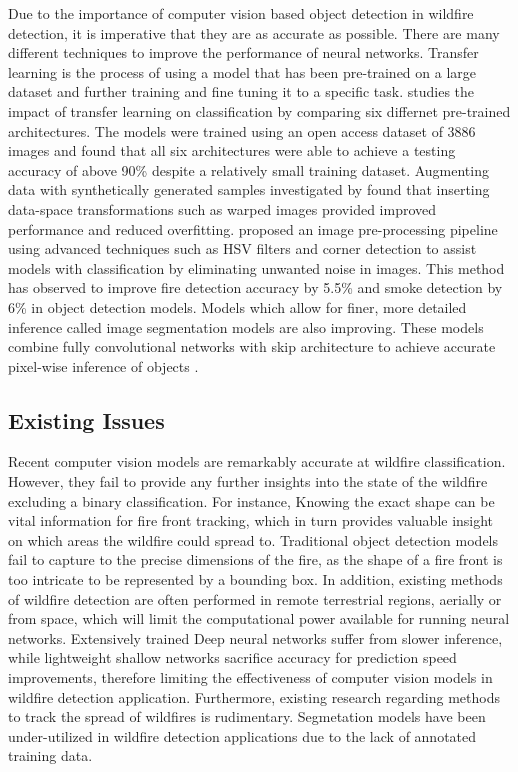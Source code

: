 \documentclass[lettersize,journal]{IEEEtran}
\begin{document}
Due to the importance of computer vision based object detection in
wildfire detection, it is imperative that they are as accurate as
possible. There are many different techniques to improve the performance
of neural networks. Transfer learning is the process of using a model
that has been pre-trained on a large dataset and further training and
fine tuning it to a specific task. \cite{transferlearning} studies the
impact of transfer learning on classification by comparing six differnet
pre-trained architectures. The models were trained using an open access
dataset of 3886 images and found that all six architectures were able to
achieve a testing accuracy of above 90\% despite a relatively small
training dataset. Augmenting data with synthetically generated samples
investigated by \cite{augment} found that inserting data-space
transformations such as warped images provided improved performance and
reduced overfitting. \cite{prepfire} proposed an image pre-processing
pipeline using advanced techniques such as HSV filters and corner
detection to assist models with classification by eliminating unwanted
noise in images. This method has observed to improve fire detection
accuracy by 5.5\% and smoke detection by 6\% in object detection models.
Models which allow for finer, more detailed inference called image segmentation models are also improving.
These models combine fully convolutional networks with skip architecture to achieve accurate pixel-wise inference of objects \cite{segmentation}.

\subsection{Existing Issues}
Recent computer vision models are remarkably accurate at wildfire classification. However, they fail to provide any further insights into the state of the wildfire excluding a binary classification. For instance, Knowing the exact shape can be vital information for fire front tracking, which in turn provides valuable insight on which areas the wildfire could spread to. Traditional object detection models fail to capture to the precise dimensions of the fire, as the shape of a fire front is too intricate to be represented by a bounding box. In addition, existing methods of wildfire detection are often performed in remote terrestrial regions, aerially or from space, which will limit the computational power available for running neural networks. Extensively trained Deep neural networks suffer from slower inference, while lightweight shallow networks sacrifice accuracy for prediction speed improvements, therefore limiting the effectiveness of computer vision models in wildfire detection application. Furthermore, existing research regarding methods to track the spread of wildfires is rudimentary. Segmetation models have been under-utilized in wildfire detection applications due to the lack of annotated training data. 
\end{document}
